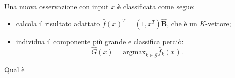 \documentclass[11pt,openany]{book}
\begin{document}
Una nuova osservazione con input $x$ è classificata come segue:
\begin{itemize}
\item calcola il risultato adattato $\hat{f}(x)^T = (1, x^T)\hat{\mathbf{B}}$, che è un $K$-vettore;
\item individua il componente più grande e classifica perciò:
\begin{equation}
\label{eq4-4}
\hat{G}(x) = \text{argmax}_{k \in \mathcal{G}} \hat{f}_k (x).
\end{equation}
\end{itemize}

Qual è 

\end{document}
